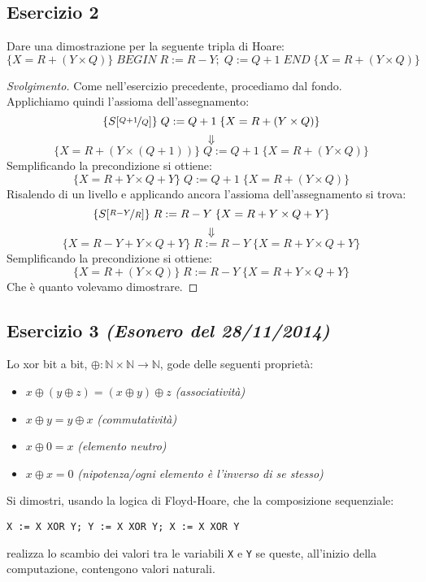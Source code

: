 \subsection{Esercizio 2}
Dare una dimostrazione per la seguente tripla di Hoare:
$$ \{X=R+(Y \times Q) \} \; BEGIN \; R:=R-Y; \; Q:=Q+1 \; END \; \{X=R+(Y \times Q)\} $$

\begin{proof}[Svolgimento]
Come nell'esercizio precedente, procediamo dal fondo.\\
Applichiamo quindi l'assioma dell'assegnamento:
$$ \{S[\nicefrac{Q+1}{Q}] \} \; Q:=Q+1 \; \{X=R+(Y \times Q)\} $$
$$ \Downarrow $$
$$ \{X=R+(Y \times (Q+1)) \} \; Q:=Q+1 \; \{X=R+(Y \times Q)\} $$
Semplificando la precondizione si ottiene:
$$ \{X=R+Y \times Q + Y \} \; Q:=Q+1 \; \{X=R+(Y \times Q)\} $$
Risalendo di un livello e applicando ancora l'assioma dell'assegnamento si trova:
$$ \{S[\nicefrac{R-Y}{R}] \} \; R:=R-Y \; \{X=R+Y \times Q + Y \} $$
$$ \Downarrow $$
$$ \{X= R-Y+Y \times Q+Y \} \; R:=R-Y \; \{X=R+Y \times Q + Y \} $$
Semplificando la precondizione si ottiene:
$$ \{X= R+(Y \times Q) \} \; R:=R-Y \; \{X=R+Y \times Q + Y \} $$
Che è quanto volevamo dimostrare.
\end{proof}

\subsection{Esercizio 3 \emph{(Esonero del 28/11/2014)}}
Lo xor bit a bit, $ \oplus: \mathbb{N} \times \mathbb{N} \rightarrow \mathbb{N} $, gode delle
seguenti proprietà:
\begin{itemize}
	\item $ x \oplus (y \oplus z) = (x \oplus y) \oplus z $ \emph{(associatività)}
	\item $ x \oplus y = y \oplus x $ \emph{(commutatività)}
	\item $ x \oplus 0 = x $ \emph{(elemento neutro)}
	\item $ x \oplus x = 0 $ \emph{(nipotenza/ogni elemento è l'inverso di se stesso)}
\end{itemize}
Si dimostri, usando la logica di Floyd-Hoare, che la composizione sequenziale:
\begin{center}
\texttt{X := X XOR Y; Y := X XOR Y; X := X XOR Y}
\end{center}
realizza lo scambio dei valori tra le variabili \texttt{X} e \texttt{Y} se queste, all'inizio della computazione, contengono valori naturali.

